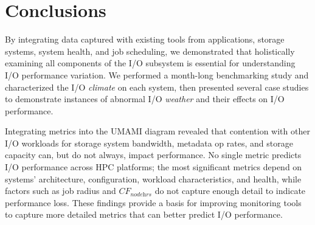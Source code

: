 \section{Conclusions} \label{sec:conclusions}

By integrating data captured with existing tools from applications, storage systems, system health, and job scheduling, we demonstrated that holistically examining all components of the I/O subsystem is essential for understanding I/O performance variation.
We performed a month-long benchmarking study and characterized the I/O \emph{climate} on each system, then presented several case studies to demonstrate instances of abnormal I/O \emph{weather} and their effects on I/O performance.

Integrating metrics into the UMAMI diagram revealed that contention with other I/O workloads for storage system bandwidth, metadata op rates, and storage capacity can, but do not always, impact performance.
No single metric predicts I/O performance across HPC platforms;
the most significant metrics depend on systems' architecture, configuration, workload characteristics, and health, while 
factors such as job radius and $\textit{CF}_{\textit{nodehrs}}$ do not capture enough detail to indicate performance loss.
These findings provide a basis for improving monitoring tools to capture more detailed metrics that can better predict I/O performance.

